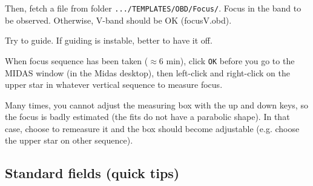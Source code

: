 \documentclass[11pt,fleqn]{book} %
\begin{document}
Then, fetch a file from folder \texttt{.../TEMPLATES/OBD/Focus/}.  Focus in the band to be observed. Otherwise, V-band should be OK (focusV.obd).

Try to guide. If guiding is instable, better to have it off.

When focus sequence has been taken ($\approx 6$ min), click \texttt{OK}
before you go to the MIDAS window (in the Midas desktop), then left-click and right-click on the upper star in whatever vertical sequence to measure focus.  

Many times, you cannot adjust the measuring box with the up and down keys, so the focus is badly estimated (the fits do not have a parabolic shape).  In that case, choose to remeasure it and the box should become adjustable (e.g. choose the upper star on other sequence).



\subsection{Standard fields (quick tips)}
\end{document}
